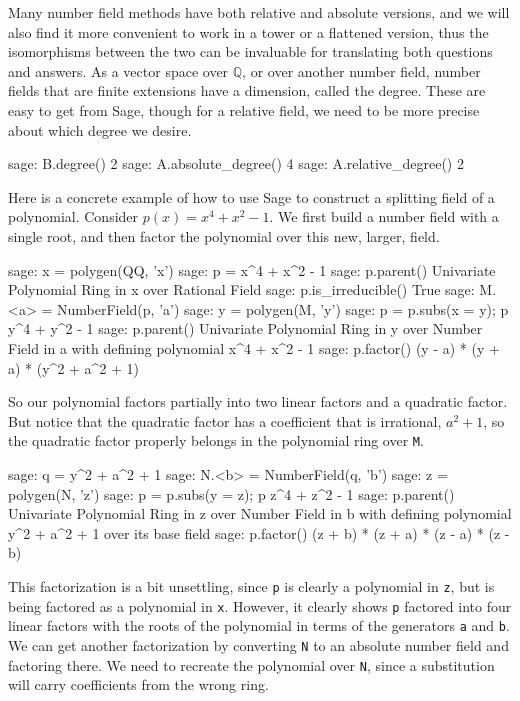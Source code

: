 %
Many number field methods have both relative and absolute versions, and we will also find it more convenient to work in a tower or a flattened version, thus the isomorphisms between the two can be invaluable for translating both questions and answers.
%
As a vector space over ${\mathbb Q}$, or over another number field, number fields that are finite extensions have a dimension, called the degree.  These are easy to get from Sage, though for a relative field, we need to be more precise about which degree we desire.
%
%
\begin{sageexample}
sage: B.degree()
2
sage: A.absolute_degree()
4
sage: A.relative_degree()
2
\end{sageexample}
%
%
Here is a concrete example of how to use Sage to construct a splitting field of a polynomial.  Consider $p(x)=x^4+x^2-1$.  We first build a number field with a single root, and then factor the polynomial over this new, larger, field.
%
\begin{sageexample}
sage: x = polygen(QQ, 'x')
sage: p = x^4 + x^2 - 1
sage: p.parent()
Univariate Polynomial Ring in x over Rational Field
sage: p.is_irreducible()
True
sage: M.<a> = NumberField(p, 'a')
sage: y = polygen(M, 'y')
sage: p = p.subs(x = y); p
y^4 + y^2 - 1
sage: p.parent()
Univariate Polynomial Ring in y over Number Field in a with
defining polynomial x^4 + x^2 - 1
sage: p.factor()
(y - a) * (y + a) * (y^2 + a^2 + 1)
\end{sageexample}
%
So our polynomial factors partially into two linear factors and a quadratic factor.  But notice that the quadratic factor has a coefficient that is irrational, $a^2+1$, so the quadratic factor properly belongs in the polynomial ring over \verb?M?.
%
\begin{sageexample}
sage: q = y^2 + a^2 + 1
sage: N.<b> = NumberField(q, 'b')
sage: z = polygen(N, 'z')
sage: p = p.subs(y = z); p
z^4 + z^2 - 1
sage: p.parent()
Univariate Polynomial Ring in z over Number Field in b with
defining polynomial y^2 + a^2 + 1 over its base field
sage: p.factor()
(z + b) * (z + a) * (z - a) * (z - b)
\end{sageexample}
%
This factorization is a bit unsettling, since \verb?p? is clearly a polynomial in \verb?z?, but is being factored as a polynomial in \verb?x?.  However, it clearly shows \verb?p? factored into four linear factors with the roots of the polynomial in terms of the generators \verb?a? and \verb?b?.  We can get another factorization by converting \verb?N? to an absolute number field and factoring there.  We need to recreate the polynomial over \verb?N?, since a substitution will carry coefficients from the wrong ring.
